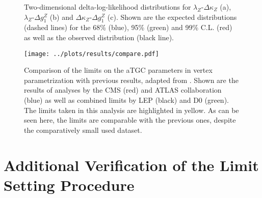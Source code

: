 \begin{figure}
	\centering
	\caption[Two-dimensional delta-log-likelihood distributions for the three combinations of aTGC parameters in the vertex parametrization]{Two-dimensional delta-log-likelihood distributions for $\lambda_Z$-$\Delta\kappa_Z$ (a), $\lambda_Z$-$\Delta g_1^Z$ (b) and $\Delta\kappa_Z$-$\Delta g_1^Z$ (c). Shown are the expected distributions (dashed lines) for the 68\% (blue), 95\% (green) and 99\% C.L. (red) as well as the observed distribution (black line).}
	\label{fig:limits:2dlimitsvertex}	
	\label{fig:limits:compare}
\end{figure}

\begin{figure}
    \centering
    \texttt{[image: ../plots/results/compare.pdf]}
    \caption[Comparison of the limits on the aTGC parameters in vertex parametrization with previous results]{Comparison of the limits on the aTGC parameters in vertex parametrization with previous results, adapted from \cite{limits_compare}. Shown are the results of analyses by the CMS (red) and ATLAS collaboration (blue) as well as combined limits by LEP (black) and D0 (green). The limits taken in this analysis are highlighted in yellow. As can be seen here, the limits are comparable with the previous ones, despite the comparatively small used dataset.}
\end{figure}

\section{Additional Verification of the Limit Setting Procedure}
\label{sec:limits:atgcint}
